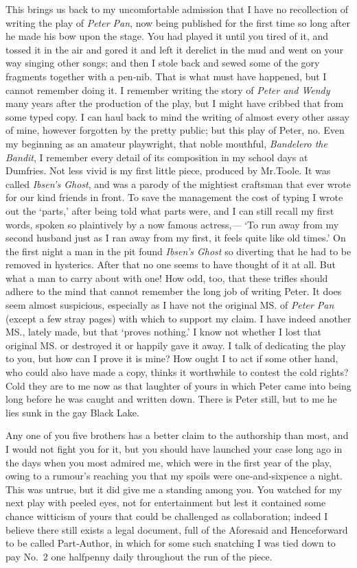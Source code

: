 This brings us back to my uncomfortable admission
that I have no recollection of writing the play of \emph{Peter Pan},
now being published for the first time so long after he made his bow upon the stage.
You had played it until you tired of it,
and tossed it in the air and gored it and left it derelict in the mud
and went on your way singing other songs;
and then I stole back and sewed some of the gory fragments together with a pen‐nib.
That is what must have happened, but I cannot remember doing it.
I remember writing the story of \emph{Peter and Wendy} many years after the production of the play,
but I might have cribbed that from some typed copy.
I can haul back to mind the writing of almost every other assay of mine,
however forgotten by the pretty public;
but this play of Peter, no.
Even my beginning as an amateur playwright,
that noble mouthful, \emph{Bandelero the Bandit},
I remember every detail of its composition in my school days at Dumfries.
Not less vivid is my first little piece, produced by Mr.\@ Toole.
It was called \emph{Ibsen’s Ghost},
and was a parody of the mightiest craftsman that ever wrote for our kind friends in front.
To save the management the cost of typing I wrote out the ‘parts,’
after being told what parts were,
and I can still recall my first words, spoken so plaintively by a now famous actress,—%
‘To run away from my second husband just as I ran away from my first,
it feels quite like old times.’
On the first night a man in the pit found \emph{Ibsen’s Ghost} so diverting
that he had to be removed in hysterics.
After that no one seems to have thought of it at all.
But what a man to carry about with one!
How odd, too, that these trifles should adhere to the mind
that cannot remember the long job of writing Peter.
It does seem almost suspicious,
especially as I have not the original MS. of \emph{Peter Pan} (except a few stray pages)
with which to support my claim.
I have indeed another MS., lately made, but that ‘proves nothing.’
I know not whether I lost that original MS. or destroyed it or happily gave it away.
I talk of dedicating the play to you, but how can I prove it is mine?
How ought I to act if some other hand, who could also have made a copy,
thinks it worthwhile to contest the cold rights?
Cold they are to me now as that laughter of yours in which Peter came into being
long before he was caught and written down.
There is Peter still, but to me he lies sunk in the gay Black Lake.

Any one of you five brothers has a better claim to the authorship than most,
and I would not fight you for it,
but you should have launched your case long ago in the days when you most admired me,
which were in the first year of the play,
owing to a rumour’s reaching you that my spoils were one‐and‐sixpence a night.
This was untrue, but it did give me a standing among you.
You watched for my next play with peeled eyes, not for entertainment
but lest it contained some chance witticism of yours that could be challenged as collaboration;
indeed I believe there still exists a legal document,
full of the Aforesaid and Henceforward to be called Part‐Author,
in which for some such snatching I was tied down
to pay No.~2 one halfpenny daily throughout the run of the piece.

